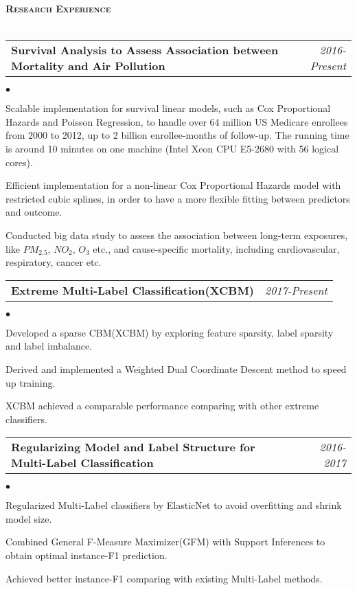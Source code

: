 \documentclass[11pt]{article}
\makeatletter
\newcommand{\lineunder}{\vspace*{-8pt} \\ \hspace*{-18pt} \hrulefill \\}
\newcommand{\header}[1]{{\hspace*{-15pt}\vspace*{6pt} \large \textsc{\textbf{#1}}} \vspace*{-6pt} \lineunder}
\newenvironment{achievements}{\begin{list}{$\bullet$}{\topsep 0pt \itemsep -2pt}}{\vspace*{4pt}\end{list}}
\newcommand{\headerrow}[2]
{\begin{tabular*}{\linewidth}{l@{\extracolsep{\fill}}r}
	\hspace*{-15pt}#1 & #2 \\
\end{tabular*}}
\newcommand{\headerrowww}[1]
{\begin{tabular*}{\linewidth}{l@{\extracolsep{\fill}}r}
	#1 &\\
\end{tabular*}}
\makeatother
\begin{document}
\vspace*{2.5pt}
\header{Research Experience}

\headerrow
{\textbf{Survival Analysis to Assess Association between Mortality and Air Pollution}}
{\emph{2016-Present}}
\begin{achievements}
	\item Scalable implementation for survival linear models, such as Cox Proportional Hazards and Poisson Regression, to handle over 64 million US Medicare enrollees from 2000 to 2012, up to 2 billion enrollee-months of follow-up. The running time is around 10 minutes on one machine (Intel Xeon CPU E5-2680 with 56 logical cores).
	\item Efficient implementation for a non-linear Cox Proportional Hazards model with restricted cubic splines, in order to have a more flexible fitting between predictors and outcome.
	\item Conducted big data study to assess the association between long-term exposures, like $PM_{2.5}$, $NO_{2}$, $O_3$ etc., and cause-specific mortality, including cardiovascular, respiratory, cancer etc.
\end{achievements}

\headerrow
{\textbf{Extreme Multi-Label Classification(XCBM)}}
{\emph{2017-Present}}
\begin{achievements}
	\item Developed a sparse CBM(XCBM) by exploring feature sparsity, label sparsity and label imbalance. 
	\item Derived and implemented a Weighted Dual Coordinate Descent method to speed up training.
	\item XCBM achieved a comparable performance comparing with other extreme classifiers.
\end{achievements}

\headerrow
{\textbf{Regularizing Model and Label Structure for Multi-Label Classification}}
{\emph{2016-2017}}
\begin{achievements}
	\item Regularized Multi-Label classifiers by ElasticNet to avoid overfitting and shrink model size.
	\item Combined General F-Measure Maximizer(GFM) with Support Inferences to obtain optimal instance-F1 prediction.
	\item Achieved better instance-F1 comparing with existing Multi-Label methods. 
\end{achievements}
\end{document}
